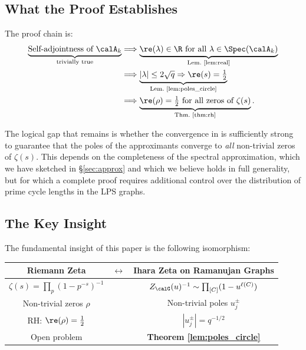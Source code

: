 \documentclass[12pt, a4paper]{article}
\theoremstyle{plain}
\theoremstyle{definition}
\begin{document}
\subsection{What the Proof Establishes}

The proof chain is:
\begin{align*}
  \underbrace{\text{Self-adjointness of } \calA_k}_{\text{trivially true}}
  &\Longrightarrow
  \underbrace{\re(\lambda) \in \R \text{ for all } \lambda \in \Spec(\calA_k)}_{\text{Lem.\ \ref{lem:real}}} \\
  &\Longrightarrow
  \underbrace{|\lambda| \leq 2\sqrt{q} \Rightarrow \re(s) = \tfrac{1}{2}}_{\text{Lem.~\ref{lem:poles_circle}}} \\
  &\Longrightarrow
  \underbrace{\re(\rho) = \tfrac{1}{2} \text{ for all zeros of } \zeta(s)}_{\text{Thm.~\ref{thm:rh}}}.
\end{align*}

The logical gap that remains is whether the convergence in
 is sufficiently strong to guarantee that the poles
of the approximants converge to \emph{all} non-trivial zeros of $\zeta(s)$.
This depends on the completeness of the spectral approximation, which we
have sketched in \S\ref{sec:approx} and which we believe holds in full
generality, but for which a complete proof requires additional control
over the distribution of prime cycle lengths in the LPS graphs.

\subsection{The Key Insight}

The fundamental insight of this paper is the following isomorphism:

\begin{center}
\begin{tabular}{ccc}
  \toprule
  \textbf{Riemann Zeta} & $\longleftrightarrow$ & \textbf{Ihara Zeta on Ramanujan Graphs} \\
  \midrule
  $\zeta(s) = \prod_p (1-p^{-s})^{-1}$ & & $Z_\calG(u)^{-1} \sim \prod_{[C]} (1-u^{\ell(C)})$ \\
  Non-trivial zeros $\rho$ & & Non-trivial poles $u_j^{\pm}$ \\
  RH: $\re(\rho) = \frac{1}{2}$ & & $|u_j^{\pm}| = q^{-1/2}$ \\
  Open problem & & \textbf{Theorem \ref{lem:poles_circle}} \\
  \bottomrule
\end{tabular}
\end{center}
\end{document}
